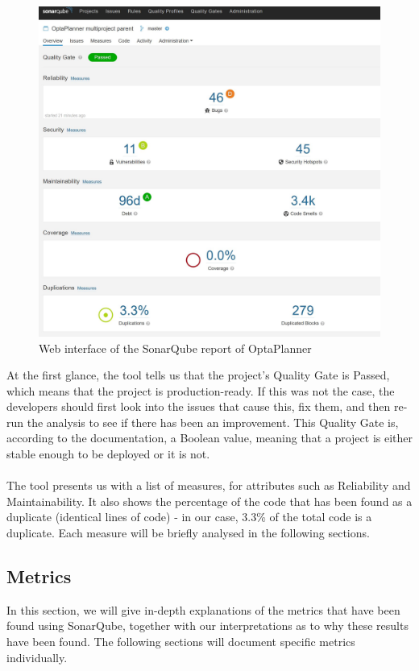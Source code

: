         \begin{figure}[H]
            \centering
            \includegraphics[scale=0.7]{figures/sonarqube_ss.JPG}
            \caption{Web interface of the SonarQube report of OptaPlanner}
            \label{fig:sonarqube_ss}
        \end{figure}
        At the first glance, the tool tells us that the project's Quality Gate is Passed, which means that the project is production-ready. If this was not the case, the developers should first look into the issues that cause this, fix them, and then re-run the analysis to see if there has been an improvement. This Quality Gate is, according to the documentation, a Boolean value, meaning that a project is either stable enough to be deployed or it is not.\\\\
        The tool presents us with a list of  measures, for attributes such as Reliability and Maintainability. It also shows the percentage of the code that has been found as a duplicate (identical lines of code) - in our case, 3.3\% of the total code is a duplicate. 
        Each measure will be briefly analysed in the following sections. 
    
    \subsection{Metrics}
        In this section, we will give in-depth explanations of the metrics that have been found using SonarQube, together with our interpretations as to why these results have been found. The following sections will document specific metrics individually.
        
